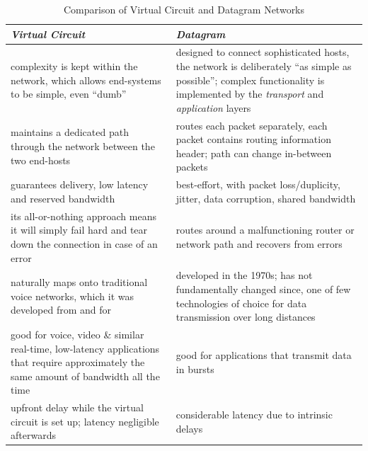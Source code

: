 \documentclass[10pt]{report}
\begin{document}
\begin{table}[h]
  \begin{tabular}{ | p{6cm} | p{6cm} | }
  \hline

  {\em Virtual Circuit}
  	& {\em Datagram} \\ \hline
  \hline

complexity is kept within the network, which allows end-systems to be simple,
even ``dumb'' \cite[p349]{kurose}
	& designed to connect sophisticated
	hosts, the network is deliberately ``as simple as possible'';  complex functionality is implemented by the {\em transport} and {\em application} layers \cite[pp349--351]{kurose}
	\\ \hline

maintains a dedicated path through the network between the two end-hosts 
	& routes each packet separately, each packet contains routing
	information header; path can change in-between packets \\ \hline

guarantees delivery, low latency and reserved bandwidth
	& best-effort, with packet loss/duplicity, jitter, data corruption,
	shared bandwidth \\ \hline

its all-or-nothing approach means it will simply fail hard and tear down the
connection in case of an error
	&  routes around a malfunctioning router or network path and recovers
	from errors \\ \hline

naturally maps onto traditional voice networks, which it was developed from and
for
	& developed in the 1970s; has not fundamentally changed since, one
	of few technologies of choice for data transmission over long distances
	\cite[p298--299]{stallings} \\ \hline

good for voice, video \& similar real-time, low-latency applications that
require approximately the same amount of bandwidth all the time
	& good for applications that transmit data in bursts \\ \hline

upfront delay while the virtual circuit is set up; latency negligible afterwards
	& considerable latency due to intrinsic delays \\ \hline

  \end{tabular}
  \caption{Comparison of Virtual Circuit and Datagram Networks}
  \label{vcdgcomparison}
\end{table} 
\end{document}
